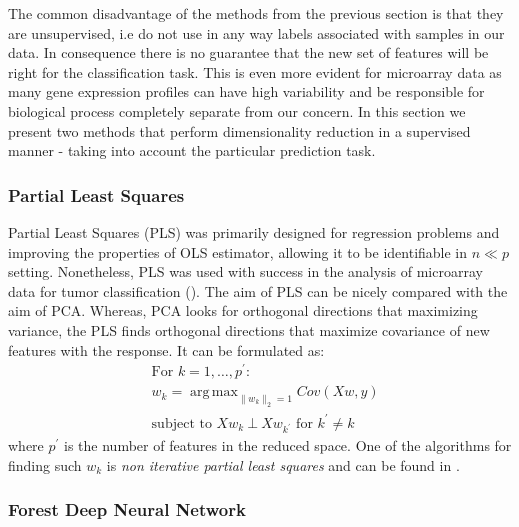 \documentclass[shortabstract, english, mgr]{iithesis}
\DeclareMathOperator*{\argmax}{arg\,max}
\begin{document}
The common disadvantage of the methods from the previous section is that they are unsupervised, i.e do not use in any way labels associated with samples in our data. In consequence there is no guarantee that the new set of features will be right for the classification task. This is even more evident for microarray data as many gene expression profiles can have high variability and be responsible for biological process completely separate from our concern. In this section we present two methods that perform dimensionality reduction in a supervised manner - taking into account the particular prediction task. 

\subsubsection{Partial Least Squares}
Partial Least Squares (PLS) was primarily designed for regression problems and improving the properties of OLS estimator, allowing it to be identifiable in $n \ll p$ setting. Nonetheless, PLS was used with success in the analysis of microarray data for tumor classification (\cite{TumorPLS}). The aim of PLS can be nicely compared with the aim of PCA. Whereas, PCA looks for orthogonal directions that maximizing variance, the PLS finds orthogonal directions that maximize covariance of new features with the response. It can be formulated as:
\begin{align*}
& \text{For $k=1, \ldots, p^{\prime}$}: \\
& w_k = \argmax_{\|w_k\|_2 = 1} Cov \left(Xw,y\right) \\
&\text{subject to } Xw_k \ \bot \  Xw_{k^{\prime}} \text{ for } k^{\prime} \neq k  
\end{align*}
where $p^{\prime}$ is the number of features in the reduced space. One of the algorithms for finding such $w_k$ is \textit{non iterative partial least squares} and can be found in \cite[chapter 3.5.2]{ESL2}. 

\subsubsection{Forest Deep Neural Network}
\end{document}
